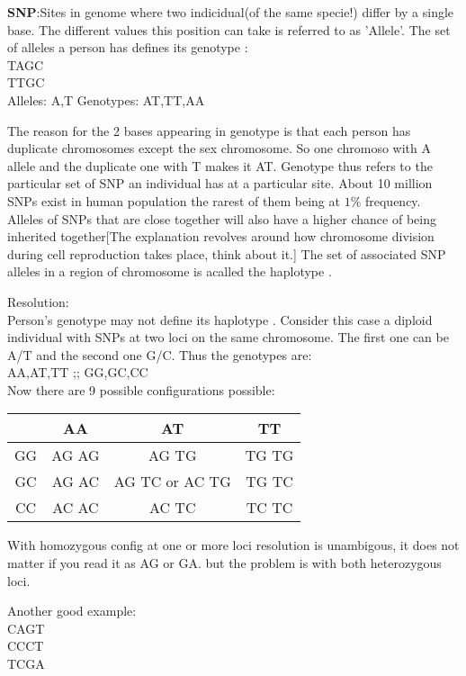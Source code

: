 \documentclass[a4paper]{article}
\begin{document}
\textbf{SNP}:Sites in genome where two indicidual(of the same specie!)  differ by a single base. The different values this position can take is referred to as 'Allele'. The set of alleles 
a person has defines its genotype : \\
T{\color{red}A}GC \\
T{\color{red}T}GC \\

Alleles: A,T
Genotypes: AT,TT,AA

The reason for the 2 bases appearing in genotype is that each person has duplicate chromosomes except the sex chromosome. So one chromoso with A allele and the duplicate one with T makes 
it AT. Genotype thus refers to the particular set of SNP an individual has at a particular site.  About 10 million SNPs exist in human population the rarest of them being at $1\% $ frequency. Alleles
of SNPs that are close together will also have a higher chance of being inherited together[The explanation revolves around how chromosome division during cell reproduction takes place, think about it.]
The set of associated SNP alleles in  a region of chromosome is acalled the haplotype . 

Resolution:\\
Person's genotype may not define its  haplotype . Consider this case a diploid individual with SNPs at two loci on the same chromosome. The  first one can be A/T and the second one
G/C. Thus the genotypes are: \\
AA,AT,TT ;; GG,GC,CC \\

Now there are 9 possible configurations possible:\\
\begin{tabular}{c|c|c|c}
 \hline
	   &  AA   &       AT       &  TT   \\
	   \hline
	GG & AG AG &     AG TG      & TG TG \\
	 \hline
	GC & AG AC & AG TC or	AC TG & TG TC \\
	 \hline
	CC & AC AC &     AC TC      & TC TC \\
	 \hline
\end{tabular}

With homozygous config at one or more loci resolution is unambigous, it does not matter if you read it as AG or GA. but the problem is with both heterozygous loci.

Another good example: \\

\color{red}{A}CA\color{green}{T}GT \\
\color{red}{A}CC\color{green}{G}CT \\
\color{red}{G}TC\color{green}{G}GA \\
\end{document}
